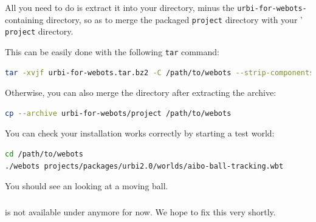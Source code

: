 All you need to do is extract it into your \webots directory, minus the
\texttt{urbi-for-webots-} containing directory, so as to
merge the packaged \texttt{project} directory with your \webots{}'
\texttt{project} directory.

This can be easily done with the following \texttt{tar} command:

\begin{lstlisting}[language=sh]
tar -xvjf urbi-for-webots.tar.bz2 -C /path/to/webots --strip-components 1
\end{lstlisting}

Otherwise, you can also merge the directory after extracting the archive:

\begin{lstlisting}[language=sh]
cp --archive urbi-for-webots/project /path/to/webots
\end{lstlisting}

You can check your installation works correctly by starting a test world:

\begin{lstlisting}[language=sh]
cd /path/to/webots
./webots projects/packages/urbi2.0/worlds/aibo-ball-tracking.wbt
\end{lstlisting}

You should see an \aibo{} looking at a moving ball.

\subsubsection{\macosx{}}

\uwebots{} is not available under \macosx{} anymore for now. We hope to
fix this very shortly.



